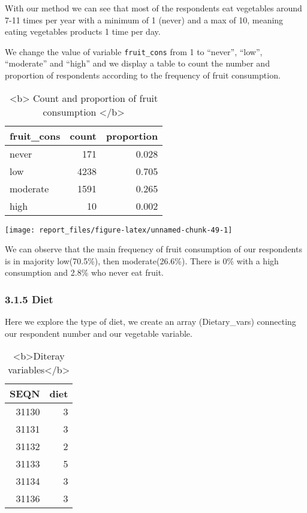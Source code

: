 \documentclass[
]{article}
\begin{document}
With our method we can see that most of the respondents eat vegetables
around 7-11 times per year with a minimum of 1 (never) and a max of 10,
meaning eating vegetables products 1 time per day.

We change the value of variable \texttt{fruit\_cons} from 1 to
``never'', ``low'', ``moderate'' and ``high'' and we display a table to
count the number and proportion of respondents according to the
frequency of fruit consumption.

\begin{table}

\caption{\label{tab:unnamed-chunk-49}<b> Count and proportion of fruit consumption </b>}
\centering
\begin{tabular}[t]{l|r|r}
\hline
fruit\_cons & count & proportion\\
\hline
never & 171 & 0.028\\
\hline
low & 4238 & 0.705\\
\hline
moderate & 1591 & 0.265\\
\hline
high & 10 & 0.002\\
\hline
\end{tabular}
\end{table}

\begin{center}\texttt{[image: report\_files/figure-latex/unnamed-chunk-49-1]} \end{center}

We can observe that the main frequency of fruit consumption of our
respondents is in majority low(70.5\%), then moderate(26.6\%). There is
0\% with a high consumption and 2.8\% who never eat fruit.

\hypertarget{diet}{%
\subsubsection{3.1.5 Diet}\label{diet}}

Here we explore the type of diet, we create an array (Dietary\_vars)
connecting our respondent number and our vegetable variable.

\begin{table}

\caption{\label{tab:unnamed-chunk-50}<b>Diteray variables</b>}
\centering
\begin{tabular}[t]{r|r}
\hline
SEQN & diet\\
\hline
31130 & 3\\
\hline
31131 & 3\\
\hline
31132 & 2\\
\hline
31133 & 5\\
\hline
31134 & 3\\
\hline
31136 & 3\\
\hline
\end{tabular}
\end{table}
\end{document}
